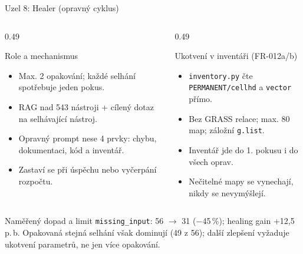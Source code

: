 \documentclass[aspectratio=169,11pt]{beamer}
\begin{document}
\begin{frame}[t]{Uzel 8: Healer (opravný cyklus)}
  \footnotesize
  \begin{columns}[T,onlytextwidth]
    \begin{column}{0.49\textwidth}
      \begin{block}{Role a mechanismus}
        \begin{itemize}
          \item Max. 2 opakování; každé selhání spotřebuje jeden pokus.
          \item RAG nad 543 nástroji + cílený dotaz na selhávající nástroj.
          \item Opravný prompt nese 4 prvky: chybu, dokumentaci, kód a inventář.
          \item Zastaví se při úspěchu nebo vyčerpání rozpočtu.
        \end{itemize}
      \end{block}
    \end{column}
    \begin{column}{0.49\textwidth}
      \begin{block}{Ukotvení v inventáři (FR-012a/b)}
        \begin{itemize}
          \item \texttt{inventory.py} čte \texttt{PERMANENT/cellhd} a
                \texttt{vector} přímo.
          \item Bez GRASS relace; max. 80 map; záložní \texttt{g.list}.
          \item Inventář jde do 1. pokusu i do všech oprav.
          \item Nečitelné mapy se vynechají, nikdy se nevymýšlejí.
        \end{itemize}
      \end{block}
    \end{column}
  \end{columns}

  \begin{alertblock}{Naměřený dopad a limit}
    \texttt{missing\_input}: 56 $\rightarrow$ 31 ($-$45\,\%); healing gain
    +12,5\,p.\,b. Opakovaná stejná selhání však dominují (49 z 56); další
    zlepšení vyžaduje ukotvení parametrů, ne jen více opakování.
  \end{alertblock}
\end{frame}

\end{document}
